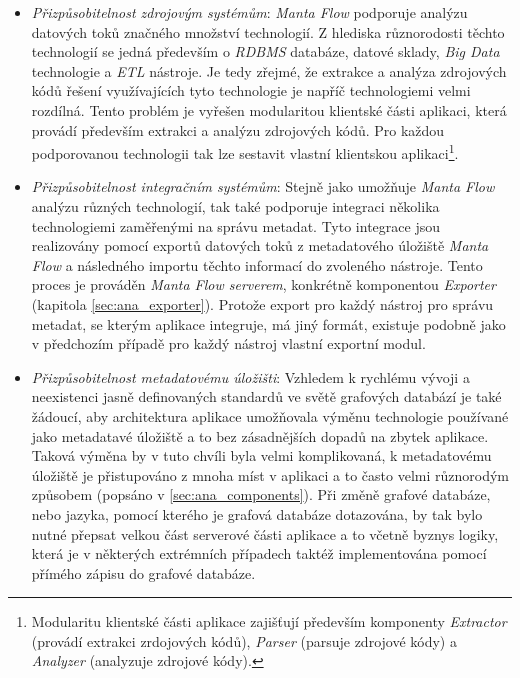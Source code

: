 \begin{itemize}
	\item{\textit{Přizpůsobitelnost zdrojovým systémům}}: \textit{Manta Flow} podporuje analýzu datových toků značného množství technologií. Z hlediska různorodosti těchto technologií se jedná především o \textit{RDBMS} databáze, datové sklady, \textit{Big Data} technologie a \textit{ETL} nástroje. Je tedy zřejmé, že extrakce a analýza zdrojových kódů řešení využívajících tyto technologie je napříč technologiemi velmi rozdílná. Tento problém je vyřešen modularitou klientské části aplikaci, která provádí především extrakci a analýzu zdrojových kódů. Pro každou podporovanou technologii tak lze sestavit vlastní klientskou aplikaci\footnote{Modularitu klientské části aplikace zajišťují především komponenty \textit{Extractor} (provádí extrakci zrdojových kódů), \textit{Parser} (parsuje zdrojové kódy) a \textit{Analyzer} (analyzuje zdrojové kódy).}.

	\item{\textit{Přizpůsobitelnost integračním systémům}}: Stejně jako umožňuje \textit{Manta Flow} analýzu různých technologií, tak také podporuje integraci několika technologiemi zaměřenými na správu metadat. Tyto integrace jsou realizovány pomocí exportů datových toků z metadatového úložiště \textit{Manta Flow} a následného importu těchto informací do zvoleného nástroje. Tento proces je prováděn \textit{Manta Flow serverem}, konkrétně komponentou \textit{Exporter} (kapitola \ref{sec:ana_exporter}). Protože export pro každý nástroj pro správu metadat, se kterým aplikace integruje, má jiný formát, existuje podobně jako v předchozím případě pro každý nástroj vlastní exportní modul.

	\item{\textit{Přizpůsobitelnost metadatovému úložišti}}: Vzhledem k rychlému vývoji a neexistenci jasně definovaných standardů ve světě grafových databází je také žádoucí, aby architektura aplikace umožňovala výměnu technologie používané jako metadatavé úložiště a to bez zásadnějších dopadů na zbytek aplikace. Taková výměna by v tuto chvíli byla velmi komplikovaná, k metadatovému úložiště je přistupováno z mnoha míst v aplikaci a to často velmi různorodým způsobem (popsáno v \ref{sec:ana_components}). Při změně grafové databáze, nebo jazyka, pomocí kterého je grafová databáze dotazována, by tak bylo nutné přepsat velkou část serverové části aplikace a to včetně byznys logiky, která je v některých extrémních případech taktéž implementována pomocí přímého zápisu do grafové databáze.


\end{itemize}
